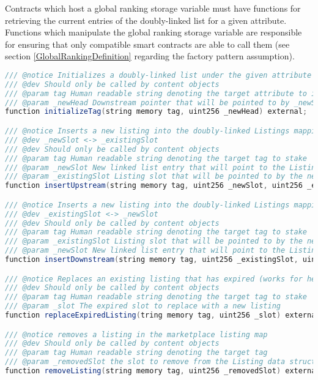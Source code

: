 Contracts which host a global ranking storage variable must have functions for retrieving the current entries of the doubly-linked list for a given attribute. Functions which manipulate the global ranking storage variable are responsible for ensuring that only compatible smart contracts are able to call them (see section \ref{GlobalRankingDefinition} regarding the factory pattern assumption).

\begin{lstlisting}[language=Java, caption=A minimal interface for reading and writing to the global ranking namespace.]
/// @notice Initializes a doubly-linked list under the given attribute
/// @dev Should only be called by content objects
/// @param tag Human readable string denoting the target attribute to insert into global ranking
/// @param _newHead Downstream pointer that will be pointed to by _newSlot
function initializeTag(string memory tag, uint256 _newHead) external;

/// @notice Inserts a new listing into the doubly-linked Listings mapping
/// @dev _newSlot <-> _existingSlot 
/// @dev Should only be called by content objects
/// @param tag Human readable string denoting the target tag to stake
/// @param _newSlot New linked list entry that will point to the Listing at _existingSlot 
/// @param _existingSlot Listing slot that will be pointed to by the new Listing at _newSlot 
function insertUpstream(string memory tag, uint256 _newSlot, uint256 _existingSlot) external;

/// @notice Inserts a new listing into the doubly-linked Listings mapping
/// @dev _existingSlot <-> _newSlot
/// @dev Should only be called by content objects
/// @param tag Human readable string denoting the target tag to stake
/// @param _existingSlot Listing slot that will be pointed to by the new Listing at _newSlot  
/// @param _newSlot New linked list entry that will point to the Listing at _existingSlot 
function insertDownstream(string memory tag, uint256 _existingSlot, uint256 _newSlot) external;

/// @notice Replaces an existing listing that has expired (works for head and tail listings)
/// @dev Should only be called by content objects
/// @param tag Human readable string denoting the target tag to stake
/// @param _slot The expired slot to replace with a new listing
function replaceExpiredListing(tring memory tag, uint256 _slot) external;

/// @notice removes a listing in the marketplace listing map
/// @dev Should only be called by content objects
/// @param tag Human readable string denoting the target tag
/// @param _removedSlot the slot to remove from the Listing data structure
function removeListing(string memory tag, uint256 _removedSlot) external;


\end{lstlisting}
